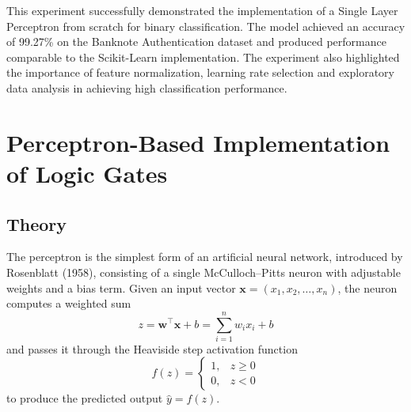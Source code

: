 \documentclass[12pt,a4paper]{article}
\begin{document}
This experiment successfully demonstrated the implementation of a Single Layer Perceptron from scratch for binary classification. The model achieved an accuracy of 99.27\% on the Banknote Authentication dataset and produced performance comparable to the Scikit-Learn implementation. The experiment also highlighted the importance of feature normalization, learning rate selection and exploratory data analysis in achieving high classification performance.


\section{Perceptron-Based Implementation of Logic Gates}

\subsection{Theory}

The perceptron is the simplest form of an artificial neural network, introduced by
Rosenblatt (1958), consisting of a single McCulloch--Pitts neuron with adjustable
weights and a bias term. Given an input vector $\mathbf{x} = (x_1, x_2, \dots, x_n)$,
the neuron computes a weighted sum
\begin{equation}
    z = \mathbf{w}^{\top}\mathbf{x} + b = \sum_{i=1}^{n} w_i x_i + b
\end{equation}
and passes it through the Heaviside step activation function
\begin{equation}
    f(z) =
    \begin{cases}
        1, & z \geq 0 \\
        0, & z < 0
    \end{cases}
\end{equation}
to produce the predicted output $\hat{y} = f(z)$.
\end{document}
